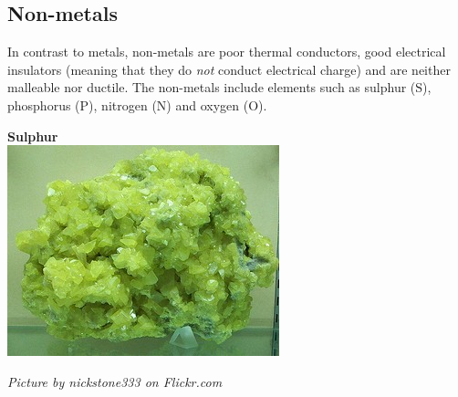             \subsection*{Non-metals}
            \nopagebreak
\begin{minipage}{.5\textwidth}
        \label{m38708*id66021}In contrast to metals, non-metals are poor thermal conductors, good electrical insulators (meaning that they do \textsl{not} conduct electrical charge) and are neither malleable nor ductile. The non-metals include elements such as sulphur ($\text{S}$), phosphorus ($\text{P}$), nitrogen ($\text{N}$) and oxygen ($\text{O}$).\par 
\end{minipage}
\begin{minipage}{.5\textwidth}
\begin{center}
\textbf{Sulphur}\\
 \includegraphics[width=.4\textwidth]{photos/sulphurby-nickstone333.jpg}\par
\textit{Picture by nickstone333 on Flickr.com}
\end{center}
\end{minipage}
      \label{m38708*uid94}
